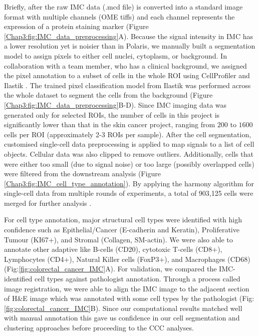 Briefly, after the raw IMC data (.mcd file) is converted into a standard image format with multiple channels (OME tiffs) and each channel represents the expression of a protein staining marker (Figure \ref{Chap3:fig:IMC_data_preprocessing}A). Because the signal intensity in IMC has a lower resolution yet is noisier than in Polaris, we manually built a segmentation model to assign pixels to either cell nuclei, cytoplasm, or background. In collaboration with a team member, who has a clinical background, we assigned the pixel annotation to a subset of cells in the whole ROI using CellProfiler and Ilastik \cite{carpenter2006cellprofiler, berg2019ilastik}. The trained pixel classification model from Ilastik was performed across the whole dataset to segment the cells from the background (Figure \ref{Chap3:fig:IMC_data_preprocessing}B-D). Since IMC imaging data was generated only for selected ROIs, the number of cells in this project is significantly lower than that in the skin cancer project, ranging from $200$ to $1600$ cells per ROI (approximately 2-3 ROIs per sample). After the cell segmentation, customised single-cell data preprocessing is applied to map signals to a list of cell objects. Cellular data was also clipped to remove outliers. Additionally, cells that were either too small (due to  signal noise) or too large (possibly overlapped cells) were filtered from the downstream analysis (Figure \ref{Chap3:fig:IMC_cell_type_annotation}). By applying the harmony algorithm for single-cell data from multiple rounds of experiments, a total of 903,125 cells were merged for further analysis \cite{korsunsky2019fast}. 

For cell type annotation, major structural cell types were identified with high confidence such as Epithelial/Cancer (E-cadherin and Keratin), Proliferative Tumour (KI67+), and Stromal (Collagen, SM-actin). We were also able to annotate other adaptive like B-cells (CD20), cytotoxic T-cells (CD8+), Lymphocytes (CD4+), Natural Killer cells (FoxP3+), and Macrophages (CD68) (Fig:\ref{fig:colorectal_cancer_IMC}A). For validation, we compared the IMC-identified cell types against pathologist annotation. Through a process called image registration, we were able to align the IMC image to the adjacent section of H\&E image which was annotated with some cell types by the pathologist (Fig:\ref{fig:colorectal_cancer_IMC}B). Since our computational results matched well with manual annotation this gave us confidence in our cell segmentation and clustering approaches before proceeding to the CCC analyses.

